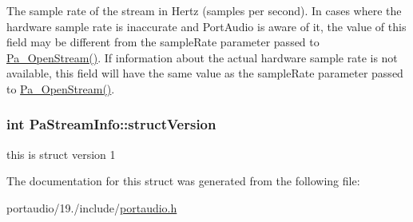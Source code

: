 The sample rate of the stream in Hertz (samples per second). In cases where the hardware sample rate is inaccurate and Port\+Audio is aware of it, the value of this field may be different from the sample\+Rate parameter passed to \hyperlink{portaudio_8h_a443ad16338191af364e3be988014cbbe}{Pa\+\_\+\+Open\+Stream()}. If information about the actual hardware sample rate is not available, this field will have the same value as the sample\+Rate parameter passed to \hyperlink{portaudio_8h_a443ad16338191af364e3be988014cbbe}{Pa\+\_\+\+Open\+Stream()}. \hypertarget{struct_pa_stream_info_a5e053a3f0f6232a5d1ec0dee0f9a943b}{
\subsubsection[{struct\+Version}]{\setlength{\rightskip}{0pt plus 5cm}int Pa\+Stream\+Info\+::struct\+Version}}\label{struct_pa_stream_info_a5e053a3f0f6232a5d1ec0dee0f9a943b}
this is struct version 1 

The documentation for this struct was generated from the following file\+:\begin{DoxyCompactItemize}
\item 
portaudio/19./include/\hyperlink{portaudio_8h}{portaudio.\+h}\end{DoxyCompactItemize}
